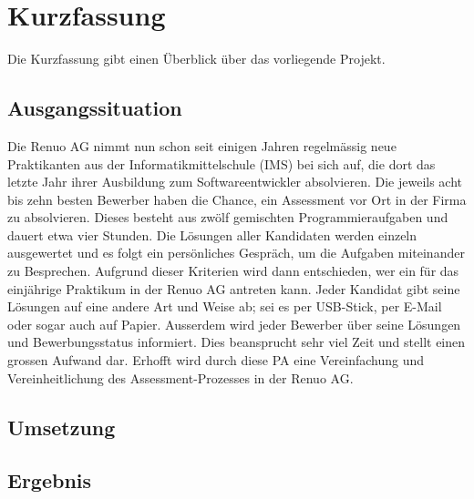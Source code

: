 \chapter{Kurzfassung}

Die Kurzfassung gibt einen Überblick über das vorliegende Projekt.

\section{Ausgangssituation}

Die Renuo AG nimmt nun schon seit einigen Jahren regelmässig neue Praktikanten aus der Informatikmittelschule (IMS) bei sich auf, die
dort das letzte Jahr ihrer Ausbildung zum Softwareentwickler absolvieren. Die jeweils acht bis zehn besten Bewerber haben die Chance, ein Assessment
vor Ort in der Firma zu absolvieren. Dieses besteht aus zwölf gemischten Programmieraufgaben und dauert etwa vier Stunden.
Die Lösungen aller Kandidaten werden einzeln ausgewertet und es folgt ein persönliches Gespräch, um die Aufgaben miteinander zu Besprechen.
Aufgrund dieser Kriterien wird dann entschieden, wer ein für das einjährige Praktikum in der Renuo AG antreten kann.
Jeder Kandidat gibt seine Lösungen auf eine andere Art und Weise ab; sei es per USB-Stick, per E-Mail oder sogar auch auf Papier.
Ausserdem wird jeder Bewerber über seine Lösungen und Bewerbungsstatus informiert.
Dies beansprucht sehr viel Zeit und stellt einen grossen Aufwand dar. Erhofft wird durch diese PA eine Vereinfachung und Vereinheitlichung des Assessment-Prozesses in der Renuo AG.

\section{Umsetzung}

\section{Ergebnis}
